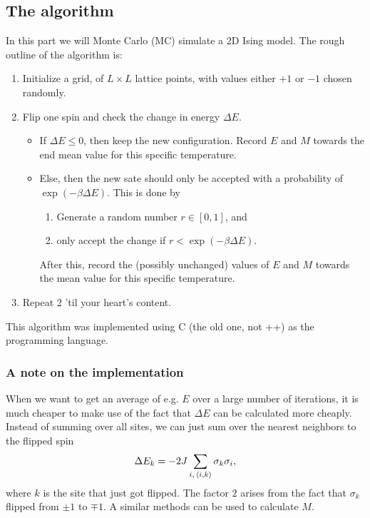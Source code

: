 \documentclass[11pt,letter, swedish, english
]{article}
\newcommand{\DE}{\ensuremath{\Delta{E}}}
\begin{document}
\subsection{The algorithm}
In this part we will Monte Carlo (MC) simulate a 2D Ising model. The
rough outline of the algorithm is:
\begin{enumerate}
\item Initialize a grid, of $L\times L$ lattice points, with values
either $+1$ or $-1$ chosen randomly.
\item Flip one spin and check the change in energy $\DE$.
\begin{itemize}
\item If $\DE\le0$, then keep the new configuration. Record $E$ and
$M$ towards the end mean value for this specific
temperature\footnotemark{}.
\item Else, then the new sate should only be accepted with a
probability of $\exp(-\beta\DE)$. This is done by
\begin{enumerate}
\item Generate a random number $r\in[0, 1]$, and
\item only accept the change if $r<\exp(-\beta\DE)$.
\end{enumerate}
\addtocounter{footnote}{-1}
After this, record the (possibly unchanged) values of $E$ and $M$
towards the mean value for this specific temperature\footnotemark{}. 
\end{itemize}
\item Repeat 2 'til your heart's content.
\end{enumerate}
This algorithm was implemented using C (the old one, not ++) as the
programming language. 

\subsubsection{A note on the implementation}
\label{sec:DE}
When we want to get an average of e.g. $E$ over a large number of
iterations, it is much cheaper to make use of the fact that $\DE$ can
be calculated more cheaply. Instead of summing over all sites, we can
just sum over the nearest neighbors to the flipped spin
\begin{equation}
\DE_k = -2J \sum_{i,\,\ev{i,k}}\sigma_k\sigma_i,
\end{equation}
where $k$ is the site that just got flipped. The factor $2$ arises
from the fact that $\sigma_k$ flipped from $\pm1$ to $\mp1$. A similar
methods can be used to calculate $M$. 
\end{document}
